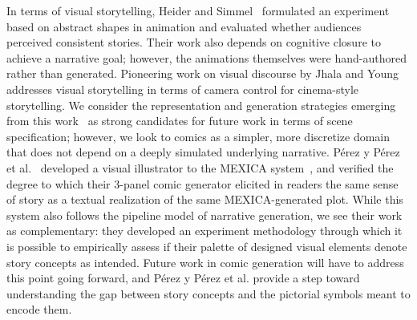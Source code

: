 In terms of visual storytelling,
Heider and Simmel~\cite{heider1944experimental} formulated an experiment
based on abstract shapes in animation and evaluated whether audiences
perceived consistent stories. Their work also depends on cognitive closure
to achieve a narrative goal; however, the animations themselves were
hand-authored rather than generated.
Pioneering work on visual discourse by Jhala and
Young~\cite{jhala2005discourse} addresses visual storytelling in terms of camera
control for cinema-style storytelling. We consider the representation
and generation strategies emerging from this work~\cite{jhala2010cinematic}
as strong candidates for future work in terms of scene specification;
however, we look to comics as a simpler, more discretize domain that does
not depend on a deeply simulated underlying narrative.
%
P\'erez y P\'erez et al.~\cite{perezyperez2012illustrating} developed a 
visual illustrator to the MEXICA system~\cite{perez2001mexica}, and verified
%
the degree to which their 3-panel comic generator 
elicited in readers the same sense of story as a textual realization of 
the same MEXICA-generated plot. 
%
While this system also follows the pipeline model of narrative generation,
we see their work as complementary: they developed an experiment
methodology through which it is possible to empirically assess if their
palette of designed visual elements denote story concepts as intended.
Future work in comic generation will have to address this point going
forward, and P\'erez y P\'erez et al. provide a step toward understanding
the gap between story concepts and the pictorial symbols meant to encode
them. 





